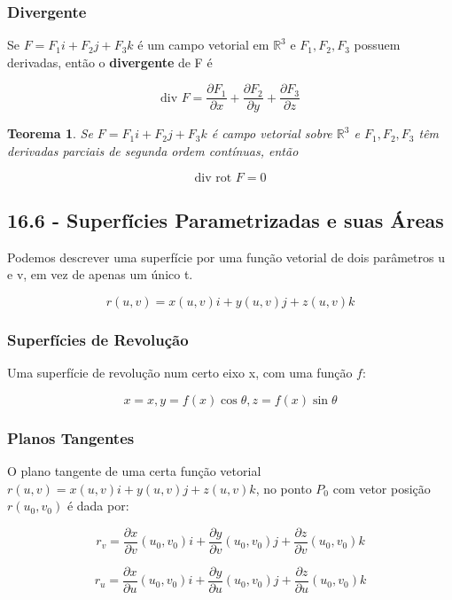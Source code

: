 \documentclass[12pt]{article}
\newtheorem{theorem}{Teorema}[section]
\begin{document}
\subsubsection*{Divergente}
Se $F = F_1 i + F_2 j + F_3 k$ é um campo vetorial em $\mathbb{R}^3$ e $F_1, F_2, F_3$ possuem derivadas, então o \textbf{divergente} de F é

$$\text{div } F = \dfrac{\partial F_1}{\partial x} + \dfrac{\partial F_2}{\partial y} + \dfrac{\partial F_3}{\partial z}$$

\begin{theorem}
    Se $F = F_1 i + F_2 j + F_3 k$ é campo vetorial sobre $\mathbb{R}^3$ e $F_1, F_2, F_3$ têm derivadas parciais de segunda ordem contínuas, então

    $$\text{div rot } F = 0$$
\end{theorem}

\subsection*{16.6 - Superfícies Parametrizadas e suas Áreas}

Podemos descrever uma superfície por uma função vetorial de dois parâmetros u e v, em vez de apenas um único t.

$$r(u, v) = x(u, v)i + y(u, v)j + z(u, v)k$$

\subsubsection*{Superfícies de Revolução}

Uma superfície de revolução num certo eixo x, com uma função $f$:

$$x = x, y = f(x) \cos{\theta}, z = f(x) \sin{\theta}$$

\subsubsection*{Planos Tangentes}

O plano tangente de uma certa função vetorial $r(u, v) = x(u, v)i + y(u, v)j + z(u, v)k$, no ponto $P_0$ com vetor posição $r(u_0, v_0)$ é dada por:

$$r_v = \dfrac{\partial x}{\partial v}(u_0, v_0)i + \dfrac{\partial y}{\partial v}(u_0, v_0)j + \dfrac{\partial z}{\partial v}(u_0, v_0)k$$

$$r_u = \dfrac{\partial x}{\partial u}(u_0, v_0)i + \dfrac{\partial y}{\partial u}(u_0, v_0)j + \dfrac{\partial z}{\partial u}(u_0, v_0)k$$
\end{document}
